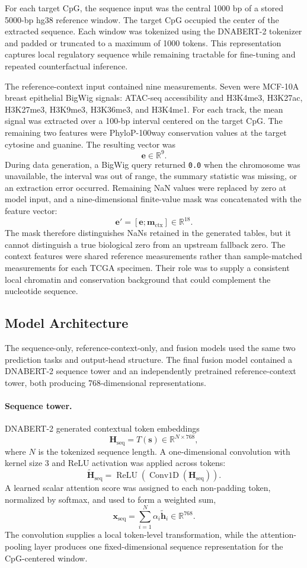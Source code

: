 \documentclass[10pt,letterpaper,twocolumn]{article}
\begin{document}
For each target CpG, the sequence input was the central 1000 bp of a
stored 5000-bp hg38 reference window. The target CpG occupied the center
of the extracted sequence. Each window was tokenized using the
DNABERT-2 tokenizer and padded or truncated to a maximum of 1000 tokens.
This representation captures local regulatory sequence while remaining
tractable for fine-tuning and repeated counterfactual inference.

The reference-context input contained nine measurements. Seven were
MCF-10A breast epithelial BigWig signals: ATAC-seq accessibility and
H3K4me3, H3K27ac, H3K27me3, H3K9me3, H3K36me3, and H3K4me1. For each
track, the mean signal was extracted over a 100-bp interval centered on
the target CpG. The remaining two features were PhyloP-100way
conservation values at the target cytosine and guanine. The resulting
vector was
\[
\mathbf e\in\mathbb R^9.
\]
During data generation, a BigWig query returned \texttt{0.0} when
the chromosome was unavailable, the interval was out of range, the
summary statistic was missing, or an extraction error occurred.
Remaining NaN values were replaced by zero at model input, and a
nine-dimensional finite-value mask was concatenated with the feature
vector:
\[
\mathbf e'=[\mathbf e;\mathbf m_{\mathrm{ctx}}]
\in\mathbb R^{18}.
\]
The mask therefore distinguishes NaNs retained in the generated tables,
but it cannot distinguish a true biological zero from an upstream
fallback zero. The context features were shared reference measurements
rather than sample-matched measurements for each TCGA specimen. Their
role was to supply a consistent local chromatin and conservation
background that could complement the nucleotide sequence.

\subsection{Model Architecture}
\label{sec:model-architecture}

The sequence-only, reference-context-only, and fusion models used the
same two prediction tasks and output-head structure. The final fusion
model contained a DNABERT-2 sequence tower and an independently
pretrained reference-context tower, both producing 768-dimensional
representations.

\paragraph{Sequence tower.}
DNABERT-2 generated contextual token embeddings
\[
\mathbf H_{\mathrm{seq}}=T(\mathbf s)
\in\mathbb R^{N\times768},
\]
where $N$ is the tokenized sequence length. A one-dimensional
convolution with kernel size 3 and ReLU activation was applied across
tokens:
\[
\widetilde{\mathbf H}_{\mathrm{seq}}
=\operatorname{ReLU}
\left(\operatorname{Conv1D}(\mathbf H_{\mathrm{seq}})\right).
\]
A learned scalar attention score was assigned to each non-padding token,
normalized by softmax, and used to form a weighted sum,
\[
\mathbf x_{\mathrm{seq}}
=\sum_{i=1}^{N}\alpha_i\widetilde{\mathbf h}_i
\in\mathbb R^{768}.
\]
The convolution supplies a local token-level transformation, while the
attention-pooling layer produces one fixed-dimensional sequence
representation for the CpG-centered window.
\end{document}
